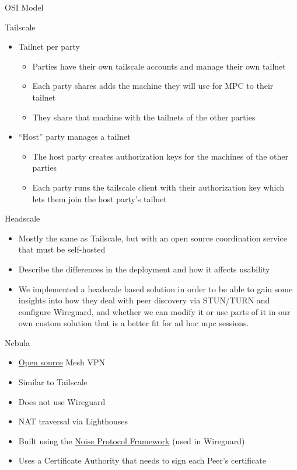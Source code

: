 \begin{frame}[fragile]{OSI Model}
\begin{block}{Tailscale}
\begin{itemize}
  \begin{itemize}
  \tightlist
  \item
    Tailnet per party

    \begin{itemize}
    \tightlist
    \item
      Parties have their own tailscale accounts and manage their own
      tailnet
    \item
      Each party shares adds the machine they will use for MPC to their
      tailnet
    \item
      They share that machine with the tailnets of the other parties
    \end{itemize}
  \item
    ``Host'' party manages a tailnet

    \begin{itemize}
    \tightlist
    \item
      The host party creates authorization keys for the machines of the
      other parties
    \item
      Each party runs the tailscale client with their authorization key
      which lets them join the host party's tailnet
    \end{itemize}
  \end{itemize}
\end{itemize}
\end{block}

\begin{block}{Headscale}
\protect\hypertarget{headscale}{}
\begin{itemize}
\tightlist
\item
  Mostly the same as Tailscale, but with an open source coordination
  service that must be self-hosted
\item
  Describe the differences in the deployment and how it affects
  usability
\item
  We implemented a headscale based solution in order to be able to gain
  some insights into how they deal with peer discovery via STUN/TURN and
  configure Wireguard, and whether we can modify it or use parts of it
  in our own custom solution that is a better fit for ad hoc mpc
  sessions.
\end{itemize}
\end{block}

\begin{block}{Nebula}
\protect\hypertarget{nebula}{}
\begin{itemize}
\tightlist
\item
  \href{https://github.com/slackhq/nebula}{Open source} Mesh VPN
\item
  Similar to Tailscale
\item
  Does not use Wireguard
\item
  NAT traversal via Lighthouses
\item
  Built using the \href{notes/02022-noise}{Noise Protocol Framework}
  (used in Wireguard)
\item
  Uses a Certificate Authority that needs to sign each Peer's
  certificate


\end{itemize}
\end{block}
\end{frame}
